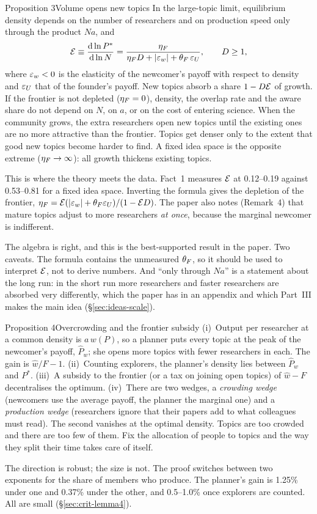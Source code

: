 \begin{resultbox}{Proposition 3}{Volume opens new topics}{\tsolid}
In the large-topic limit, equilibrium density depends on the number of researchers and on production speed only through the product $Na$, and
\[
\mathcal{E}\equiv\frac{\mathrm{d}\ln P^*}{\mathrm{d}\ln N}=\frac{\eta_F}{\eta_F D+|\varepsilon_w|+\theta_F\,\varepsilon_U},\qquad D\ge 1,
\]
where $\varepsilon_w<0$ is the elasticity of the newcomer's payoff with respect to density and $\varepsilon_U$ that of the founder's payoff. New topics absorb a share $1-D\mathcal{E}$ of growth. If the frontier is not depleted ($\eta_F=0$), density, the overlap rate and the aware share do not depend on $N$, on $a$, or on the cost of entering science.
\tcblower
\inwords When the community grows, the extra researchers open new topics until the existing ones are no more attractive than the frontier. Topics get denser only to the extent that good new topics become harder to find. A fixed idea space is the opposite extreme ($\eta_F\to\infty$): all growth thickens existing topics.

\role This is where the theory meets the data. Fact~1 measures $\mathcal{E}$ at 0.12--0.19 against 0.53--0.81 for a fixed idea space. Inverting the formula gives the depletion of the frontier, $\eta_F=\mathcal{E}(|\varepsilon_w|+\theta_F\varepsilon_U)/(1-\mathcal{E} D)$. The paper also notes (Remark~4) that mature topics adjust to more researchers \emph{at once}, because the marginal newcomer is indifferent.

\review The algebra is right, and this is the best-supported result in the paper. Two caveats. The formula contains the unmeasured $\theta_F$, so it should be used to interpret $\mathcal{E}$, not to derive numbers. And ``only through $Na$'' is a statement about the long run: in the short run more researchers and faster researchers are absorbed very differently, which the paper has in an appendix and which Part~III makes the main idea (\S\ref{sec:ideas-scale}).
\end{resultbox}

\begin{resultbox}{Proposition 4}{Overcrowding and the frontier subsidy}{\trepair}
(i)~Output per researcher at a common density is $a\,w(P)$, so a planner puts every topic at the peak of the newcomer's payoff, $\hat P_w$; she opens more topics with fewer researchers in each. The gain is $\hat w/F-1$.
(ii)~Counting explorers, the planner's density lies between $\hat P_w$ and $P^*$.
(iii)~A subsidy to the frontier (or a tax on joining open topics) of $\hat w-F$ decentralises the optimum.
(iv)~There are two wedges, a \emph{crowding wedge} (newcomers use the average payoff, the planner the marginal one) and a \emph{production wedge} (researchers ignore that their papers add to what colleagues must read). The second vanishes at the optimal density.
\tcblower
\inwords Topics are too crowded and there are too few of them. Fix the allocation of people to topics and the way they split their time takes care of itself.

\review The direction is robust; the size is not. The proof switches between two exponents for the share of members who produce. The planner's gain is 1.25\% under one and 0.37\% under the other, and 0.5--1.0\% once explorers are counted. All are small (\S\ref{sec:crit-lemma4}).
\end{resultbox}

